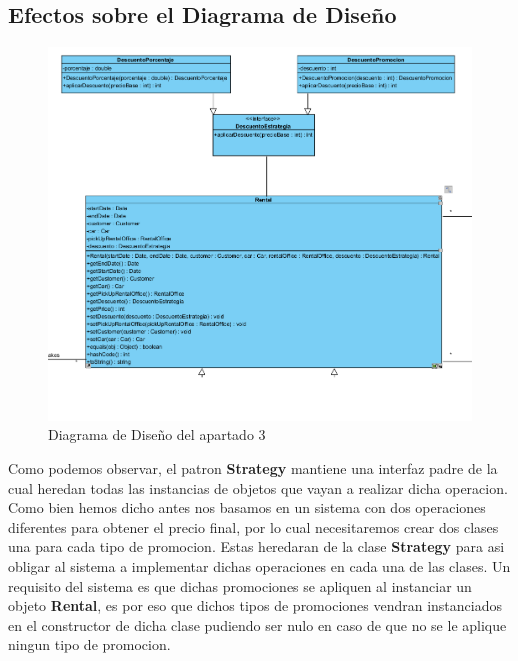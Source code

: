 \subsection{Efectos sobre el Diagrama de Diseño}

\begin{figure}[H]
    \centering
     \includegraphics[width=1\linewidth]{assets/diagramas/UML_Apartado3.png}
     \caption{Diagrama de Diseño del apartado 3}
\end{figure}

Como podemos observar, el patron \textbf{Strategy} mantiene una interfaz padre de la cual heredan todas las instancias de objetos que vayan a realizar dicha operacion.
Como bien hemos dicho antes nos basamos en un sistema con dos operaciones diferentes para obtener el precio final, por lo cual necesitaremos crear dos clases una para cada tipo de 
promocion. Estas heredaran de la clase \textbf{Strategy} para asi obligar al sistema a implementar dichas operaciones en cada una de las clases. Un requisito del sistema es que dichas
promociones se apliquen al instanciar un objeto \textbf{Rental}, es por eso que dichos tipos de promociones vendran instanciados en el constructor de dicha clase pudiendo ser nulo en caso 
de que no se le aplique ningun tipo de promocion.\par

